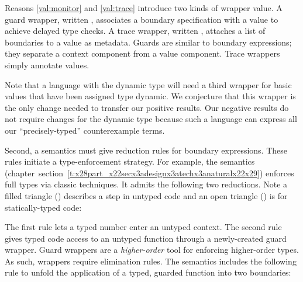 \documentclass[ twoside,open=right,titlepage,numbers=noenddot,headinclude,%
                footinclude=true,cleardoublepage=empty,abstract=off,
                BCOR=5mm,paper=a4,fontsize=11pt,%
                ngerman,american,%
                parts,pdfspacing]{scrreprt}
\newcommand{\SecRef}[2]{section~#1}
\newcommand{\SecRefLocal}[3]{\hyperref[#1]{\SecRef{#2}{#3}}}
\renewcommand{\SecRefLocal}[3]{section~\ref{#1}}
\begin{document}
\noindent Reasons \ref{val:monitor} and \ref{val:trace} introduce two kinds of
 wrapper value.
A guard wrapper, written \relax{$\emon{\sbnd}{\svalue}$}, associates a boundary
 specification with a value to achieve delayed type checks.
A trace wrapper, written \relax{$\ehist{\sblist}{\svalue}$}, attaches a list of
 boundaries to a value as metadata.
Guards are similar to boundary expressions; they separate a context
 component from a value component.
Trace wrappers simply annotate values.

Note that a language with the dynamic type will need a third
  wrapper for basic values that have been assigned type dynamic.
We conjecture that this wrapper is the only change needed to transfer our
 positive results.
Our negative results do not require changes for the dynamic type because
 such a language can express all our {``}precisely{-}typed{''} counterexample terms.

Second, a semantics must give reduction rules for boundary expressions.
These rules initiate a type{-}enforcement strategy.
For example, the \relax{\nname} semantics (chapter~\SecRefLocal{t:x28part_x22secx3adesignx3atechx3anaturalx22x29}{4.5.5}{\relax{\nname} and its Properties})
 enforces full types via classic techniques.
It admits the following two reductions.
Note a filled triangle (\relax{$\snreddyn$}) describes a step in untyped
 code and an open triangle (\relax{$\snredsta$}) is for statically{-}typed code:



\noindent{}The first rule lets a typed number enter an untyped context.
The second rule gives typed code access to an untyped function through a newly{-}created
 guard wrapper.
Guard wrappers are a \emph{higher{-}order} tool for enforcing higher{-}order types.
As such, wrappers require elimination rules.
The \relax{\nname} semantics includes the following rule to unfold
 the application of a typed, guarded function into two boundaries:
\end{document}
